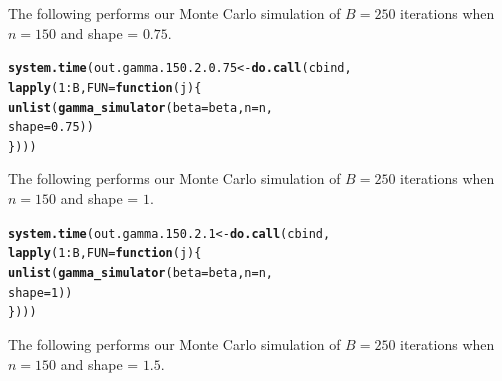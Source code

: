 \documentclass[11pt]{article}\usepackage[]{graphicx}\usepackage[]{color}
\makeatletter
\newcommand{\hlnum}[1]{\textcolor[rgb]{0.686,0.059,0.569}{#1}}%
\newcommand{\hlopt}[1]{\textcolor[rgb]{0,0,0}{#1}}%
\newcommand{\hlstd}[1]{\textcolor[rgb]{0.345,0.345,0.345}{#1}}%
\newcommand{\hlkwa}[1]{\textcolor[rgb]{0.161,0.373,0.58}{\textbf{#1}}}%
\newcommand{\hlkwb}[1]{\textcolor[rgb]{0.69,0.353,0.396}{#1}}%
\newcommand{\hlkwc}[1]{\textcolor[rgb]{0.333,0.667,0.333}{#1}}%
\newcommand{\hlkwd}[1]{\textcolor[rgb]{0.737,0.353,0.396}{\textbf{#1}}}%
\newenvironment{kframe}{%
 \def\at@end@of@kframe{}%
 \ifinner\ifhmode%
  \def\at@end@of@kframe{\end{minipage}}%
  \begin{minipage}{\columnwidth}%
 \fi\fi%
 \def\FrameCommand##1{\hskip\@totalleftmargin \hskip-\fboxsep
 \colorbox{shadecolor}{##1}\hskip-\fboxsep
     \hskip-\linewidth \hskip-\@totalleftmargin \hskip\columnwidth}%
 \MakeFramed {\advance\hsize-\width
   \@totalleftmargin\z@ \linewidth\hsize
   \@setminipage}}%
 {\par\unskip\endMakeFramed%
 \at@end@of@kframe}
\newenvironment{knitrout}{}{} %
\makeatother
\begin{document}
The following performs our Monte Carlo simulation of $B = 250$ iterations 
when $n = 150$ and shape = $0.75$.

\begin{knitrout}
\color{fgcolor}\begin{kframe}
\begin{alltt}
\hlkwd{system.time}\hlstd{(out.gamma.150.2.0.75} \hlkwb{<-} \hlkwd{do.call}\hlstd{(cbind,}
  \hlkwd{lapply}\hlstd{(}\hlnum{1}\hlopt{:}\hlstd{B,} \hlkwc{FUN} \hlstd{=} \hlkwa{function}\hlstd{(}\hlkwc{j}\hlstd{)\{}
    \hlkwd{unlist}\hlstd{(}\hlkwd{gamma_simulator}\hlstd{(}\hlkwc{beta} \hlstd{= beta,} \hlkwc{n} \hlstd{= n,}
      \hlkwc{shape} \hlstd{=} \hlnum{0.75}\hlstd{))}
\hlstd{\})))}
\end{alltt}


{\ttfamily\noindent\bfseries\color{errorcolor}{\#\# Error in r[, l]/mad.predict.fun(out.mad, xx): non-numeric argument to binary operator}}

{\ttfamily\noindent\itshape\color{messagecolor}{\#\# Timing stopped at: 1.656 0 1.659}}\end{kframe}
\end{knitrout}


The following performs our Monte Carlo simulation of $B = 250$ iterations 
when $n = 150$ and shape = $1$.

\begin{knitrout}
\color{fgcolor}\begin{kframe}
\begin{alltt}
\hlkwd{system.time}\hlstd{(out.gamma.150.2.1} \hlkwb{<-} \hlkwd{do.call}\hlstd{(cbind,}
  \hlkwd{lapply}\hlstd{(}\hlnum{1}\hlopt{:}\hlstd{B,} \hlkwc{FUN} \hlstd{=} \hlkwa{function}\hlstd{(}\hlkwc{j}\hlstd{)\{}
    \hlkwd{unlist}\hlstd{(}\hlkwd{gamma_simulator}\hlstd{(}\hlkwc{beta} \hlstd{= beta,} \hlkwc{n} \hlstd{= n,}
      \hlkwc{shape} \hlstd{=} \hlnum{1}\hlstd{))}
\hlstd{\})))}
\end{alltt}


{\ttfamily\noindent\bfseries\color{errorcolor}{\#\# Error in r[, l]/mad.predict.fun(out.mad, xx): non-numeric argument to binary operator}}

{\ttfamily\noindent\itshape\color{messagecolor}{\#\# Timing stopped at: 1.518 0 1.518}}\end{kframe}
\end{knitrout}


The following performs our Monte Carlo simulation of $B = 250$ iterations 
when $n = 150$ and shape = $1.5$.
\end{document}
